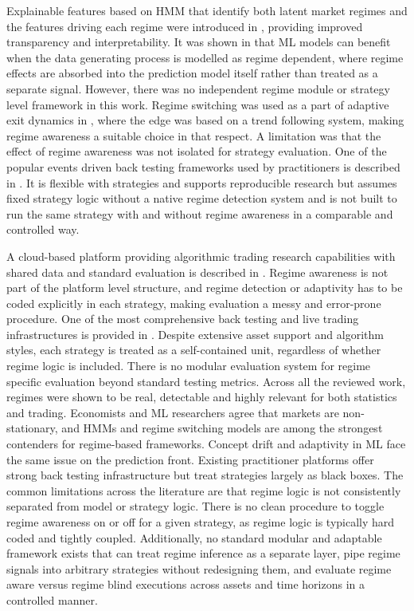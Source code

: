 \documentclass[conference]{IEEEtran}
\begin{document}
Explainable features based on HMM that identify both latent market regimes and the features driving each regime were introduced in \cite{b13}, providing improved transparency and interpretability. It was shown in \cite{b14} that ML models can benefit when the data generating process is modelled as regime dependent, where regime effects are absorbed into the prediction model itself rather than treated as a separate signal. However, there was no independent regime module or strategy level framework in this work. Regime switching was used as a part of adaptive exit dynamics in \cite{b15}, where the edge was based on a trend following system, making regime awareness a suitable choice in that respect. A limitation was that the effect of regime awareness was not isolated for strategy evaluation. One of the popular events driven back testing frameworks used by practitioners is described in \cite{b16}. It is flexible with strategies and supports reproducible research but assumes fixed strategy logic without a native regime detection system and is not built to run the same strategy with and without regime awareness in a comparable and controlled way.

A cloud-based platform providing algorithmic trading research capabilities with shared data and standard evaluation is described in \cite{b17}. Regime awareness is not part of the platform level structure, and regime detection or adaptivity has to be coded explicitly in each strategy, making evaluation a messy and error-prone procedure. One of the most comprehensive back testing and live trading infrastructures is provided in \cite{b18}. Despite extensive asset support and algorithm styles, each strategy is treated as a self-contained unit, regardless of whether regime logic is included. There is no modular evaluation system for regime specific evaluation beyond standard testing metrics. Across all the reviewed work, regimes were shown to be real, detectable and highly relevant for both statistics and trading. Economists and ML researchers agree that markets are non-stationary, and HMMs and regime switching models are among the strongest contenders for regime-based frameworks. Concept drift and adaptivity in ML face the same issue on the prediction front. Existing practitioner platforms offer strong back testing infrastructure but treat strategies largely as black boxes. The common limitations across the literature are that regime logic is not consistently separated from model or strategy logic. There is no clean procedure to toggle regime awareness on or off for a given strategy, as regime logic is typically hard coded and tightly coupled. Additionally, no standard modular and adaptable framework exists that can treat regime inference as a separate layer, pipe regime signals into arbitrary strategies without redesigning them, and evaluate regime aware versus regime blind executions across assets and time horizons in a controlled manner.
\end{document}

